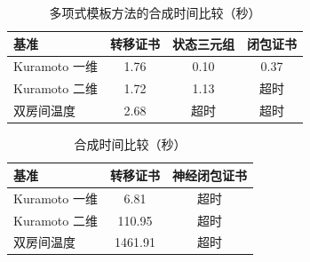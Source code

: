 \begin{table}[t]
\centering
\caption{多项式模板方法的合成时间比较（秒）}
\label{tab:results-poly}
\begin{tabular}{lccc}
\hline
\textbf{基准} & \textbf{转移证书} & \textbf{状态三元组} & \textbf{闭包证书} \\
\hline
Kuramoto 一维 & 1.76 & 0.10 & 0.37 \\
Kuramoto 二维 & 1.72 & 1.13 & 超时 \\
双房间温度 & 2.68 & 超时 & 超时 \\
\hline
\end{tabular}
\end{table}
\begin{table}[t]
\centering
\caption{合成时间比较（秒）}
\label{tab:results-neural}
\begin{tabular}{lcc}
\hline
\textbf{基准} & \textbf{转移证书} & \textbf{神经闭包证书} \\
\hline
Kuramoto 一维 & 6.81 & 超时 \\
Kuramoto 二维 & 110.95 & 超时 \\
双房间温度 & 1461.91 & 超时 \\
\hline
\end{tabular}
\end{table}
